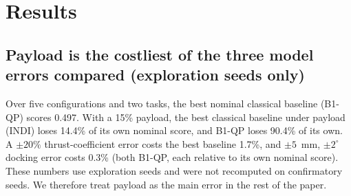 \documentclass[conference]{IEEEtran}
\begin{document}
\section{Results}\label{sec:results}
\subsection{Payload is the costliest of the three model errors compared (exploration seeds only)}
Over five configurations and two tasks, the best nominal classical baseline (B1-QP) scores 0.497. %
With a 15\% payload, the best classical baseline under payload (INDI) loses 14.4\% of its own nominal score, and B1-QP loses 90.4\% of its own. %
A $\pm20\%$ thrust-coefficient error costs the best baseline 1.7\%, and $\pm5$~mm, $\pm2^\circ$ docking error costs 0.3\% (both B1-QP, each relative to its own nominal score). %
These numbers use exploration seeds and were not recomputed on confirmatory seeds. %
We therefore treat payload as the main error in the rest of the paper.
\end{document}
